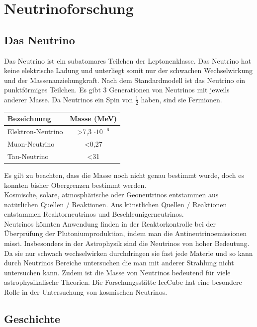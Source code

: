 \chapter{Neutrinoforschung} 
    \vspace{8pt}
    \section{Das Neutrino}
    Das Neutrino ist ein subatomares Teilchen der Leptonenklasse. Das Neutrino hat keine 
    elektrische Ladung und unterliegt somit nur der schwachen Wechselwirkung und der Massenanziehungkraft. 
    Nach dem Standardmodell ist das Neutrino ein punktförmiges Teilchen. Es gibt 3 Generationen 
    von Neutrinos mit jeweils anderer Masse. Da Neutrinos ein Spin von $\frac{1}{2}$ haben, sind sie Fermionen. \\ \cite{Stoecker2000} 
    \begin{center}
        \begin{tabular}{ | l | c | } \hline
            Bezeichnung & Masse (MeV) \\ \hline
            Elektron-Neutrino & >7,3 $\cdot 10^{-6}$\\ 
            Muon-Neutrino & <0,27  \\ 
            Tau-Neutrino & <31 \\ \hline
        \end{tabular}             
    \end{center} 
    Es gilt zu beachten, dass die Masse noch nicht genau bestimmt wurde, 
    doch es konnten bisher Obergrenzen bestimmt werden.\\
    Kosmische, solare, atmosphärische oder Geoneutrinos entstammen aus natürlichen Quellen / Reaktionen.
    Aus künstlichen Quellen / Reaktionen entstammen Reaktorneutrinos und Beschleunigerneutrinos. \\
    Neutrinos könnten Anwendung finden in der Reaktorkontrolle bei der Überprüfung der Plutoniumproduktion, indem 
    man die Antineutrinoemissionen misst. \cite{Krauter2006} 
    Insbesonders in der Astrophysik sind die Neutrinos von hoher Bedeutung. 
    Da sie nur schwach wechselwirken durchdringen sie fast jede Materie und so kann durch Neutrinos Bereiche 
    untersuchen die man mit anderer Strahlung nicht untersuchen kann.
    Zudem ist die Masse von Neutrinos bedeutend für viele astrophysikalische Theorien. \cite{Gelmini2010}
    Die Forschungsstätte IceCube hat eine besondere Rolle in der Untersuchung von kosmischen Neutrinos.
    \section{Geschichte} 

